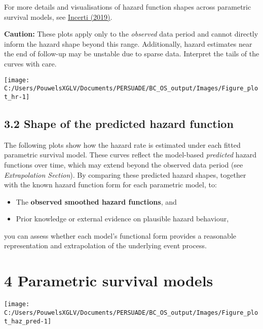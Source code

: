 \documentclass[
]{article}
\providecommand{\tightlist}{%
  \setlength{\itemsep}{0pt}\setlength{\parskip}{0pt}}
\begin{document}
For more details and visualisations of hazard function shapes across
parametric survival models, see
\href{https://devinincerti.com/2019/06/18/parametric_survival.html}{Incerti
(2019)}.

\textbf{Caution:} These plots apply only to the \emph{observed} data
period and cannot directly inform the hazard shape beyond this range.
Additionally, hazard estimates near the end of follow-up may be unstable
due to sparse data. Interpret the tails of the curves with care.

\clearpage

\begin{flushleft}\texttt{[image: C:/Users/PouwelsXGLV/Documents/PERSUADE/BC\_OS\_output/Images/Figure\_plot\_hr-1]} \end{flushleft}

\clearpage

\subsection{3.2 Shape of the predicted hazard
function}\label{shape-of-the-predicted-hazard-function}

The following plots show how the hazard rate is estimated under each
fitted parametric survival model. These curves reflect the model-based
\emph{predicted} hazard functions over time, which may extend beyond the
observed data period (see \emph{Extrapolation Section}). By comparing
these predicted hazard shapes, together with the known hazard function
form for each parametric model, to:

\begin{itemize}
\tightlist
\item
  The \textbf{observed smoothed hazard functions}, and\\
\item
  Prior knowledge or external evidence on plausible hazard behaviour,
\end{itemize}

you can assess whether each model's functional form provides a
reasonable representation and extrapolation of the underlying event
process.

\clearpage

\section{4 Parametric survival models}\label{parametric-survival-models}

\begin{flushleft}\texttt{[image: C:/Users/PouwelsXGLV/Documents/PERSUADE/BC\_OS\_output/Images/Figure\_plot\_haz\_pred-1]} \end{flushleft}
\end{document}
